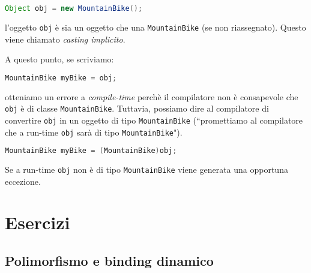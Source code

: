 \documentclass{article}
\begin{document}
\begin{lstlisting}[language=Java,escapechar=|]
Object obj = new MountainBike();
\end{lstlisting}
l'oggetto \texttt{obj} \`e sia un oggetto che una \texttt{MountainBike} (se non riassegnato). Questo viene chiamato \emph{casting implicito}.

A questo punto, se scriviamo: 
\begin{lstlisting}[language=Java,escapechar=|]
MountainBike myBike = obj;
\end{lstlisting}
otteniamo un errore a \emph{compile-time} perch\`e il compilatore non \`e consapevole che \texttt{obj} \`e di classe \texttt{MountainBike}. Tuttavia, possiamo dire al compilatore di convertire \texttt{obj} in un oggetto di tipo \texttt{MountainBike} (``promettiamo al compilatore che a run-time \texttt{obj} sar\`a di tipo \texttt{MountainBike}").

\begin{lstlisting}[language=Java,escapechar=|]
MountainBike myBike = (MountainBike)obj;
\end{lstlisting}
Se a run-time \texttt{obj} non \`e di tipo \texttt{MountainBike} viene generata una opportuna eccezione.

\section{Esercizi}


\subsection{Polimorfismo e binding dinamico}
\end{document}
